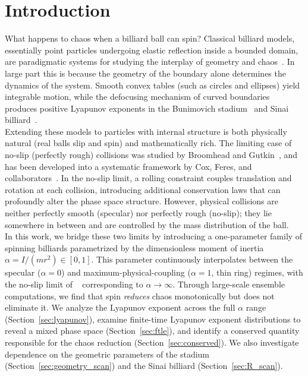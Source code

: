 \documentclass[aps,prd,twocolumn,superscriptaddress,nofootinbib,floatfix]{revtex4-2}
\begin{document}
\maketitle

\section{Introduction}
\label{sec:intro}
\noindent
What happens to chaos when a billiard ball can spin? Classical billiard models, essentially point particles undergoing elastic reflection inside a bounded domain, are paradigmatic systems for studying the interplay of geometry and chaos~\cite{benettin1978,bunimovich1979,sinai1970,chernov2006,tabachnikov2005,gutkin2012}. In large part this is because the geometry of the boundary alone determines the dynamics of the system. Smooth convex tables (such as circles and ellipses) yield integrable motion, while the defocusing mechanism of curved boundaries~\cite{donnay1991,wojtkowski1986} produces positive Lyapunov exponents in the Bunimovich stadium~\cite{bunimovich1979} and Sinai billiard~\cite{sinai1970,benettin1976}.\\

\noindent
Extending these models to particles with internal structure is both physically natural (real balls slip and spin) and mathematically rich. The limiting case of no-slip (perfectly rough) collisions was studied by Broomhead and Gutkin~\cite{broomhead1993}, and has been developed into a systematic framework by Cox, Feres, and collaborators~\cite{cox2017,cox2018,cox2022,cox2021,cox2026}. In the no-slip limit, a rolling constraint couples translation and rotation at each collision, introducing additional conservation laws that can profoundly alter the phase space structure. However, physical collisions are neither perfectly smooth (specular) nor perfectly rough (no-slip); they lie somewhere in between and are controlled by the mass distribution of the ball.\\

\noindent
In this work, we bridge these two limits by introducing a one-parameter family of spinning billiards parametrized by the dimensionless moment of inertia~$\alpha = I/(mr^2) \in [0,1]$. This parameter continuously interpolates between the specular ($\alpha=0$) and maximum-physical-coupling ($\alpha=1$, thin ring) regimes, with the no-slip limit of ~\cite{broomhead1993,cox2026} corresponding to $\alpha \to \infty$.
Through large-scale ensemble computations, we find that spin \emph{reduces} chaos monotonically but does not eliminate it. We analyze the Lyapunov exponent across the full $\alpha$ range (Section~\ref{sec:lyapunov}), examine finite-time Lyapunov exponent distributions to reveal a mixed phase space (Section~\ref{sec:ftle}), and identify a conserved quantity responsible for the chaos reduction (Section~\ref{sec:conserved}). We also investigate dependence on the geometric parameters of the stadium (Section~\ref{sec:geometry_scan}) and the Sinai billiard (Section~\ref{sec:R_scan}).
\end{document}
